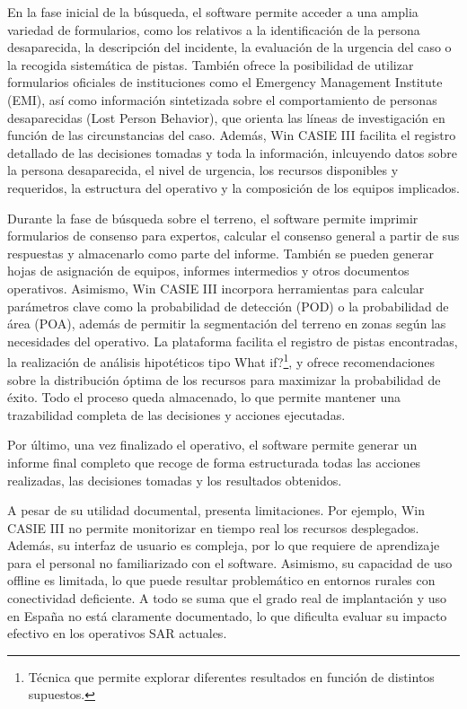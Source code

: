     En la fase inicial de la búsqueda, el software permite acceder a una amplia variedad de formularios, como los relativos a la identificación de la persona desaparecida, la descripción del incidente, la evaluación de la urgencia del caso o la recogida sistemática de pistas. También ofrece la posibilidad de utilizar formularios oficiales de instituciones como el Emergency Management Institute (EMI), así como información sintetizada sobre el comportamiento de personas desaparecidas (Lost Person Behavior), que orienta las líneas de investigación en función de las circunstancias del caso. Además, Win CASIE III facilita el registro detallado de las decisiones tomadas y toda la información, inlcuyendo datos sobre la persona desaparecida, el nivel de urgencia, los recursos disponibles y requeridos, la estructura del operativo y la composición de los equipos implicados.

    Durante la fase de búsqueda sobre el terreno, el software permite imprimir formularios de consenso para expertos, calcular el consenso general a partir de sus respuestas y almacenarlo como parte del informe. También se pueden generar hojas de asignación de equipos, informes intermedios y otros documentos operativos. Asimismo, Win CASIE III incorpora herramientas para calcular parámetros clave como la probabilidad de detección (POD) o la probabilidad de área (POA), además de permitir la segmentación del terreno en zonas según las necesidades del operativo. La plataforma facilita el registro de pistas encontradas, la realización de análisis hipotéticos tipo What if?\footnote{Técnica que permite explorar diferentes resultados en función de distintos supuestos.}, y ofrece recomendaciones sobre la distribución óptima de los recursos para maximizar la probabilidad de éxito. Todo el proceso queda almacenado, lo que permite mantener una trazabilidad completa de las decisiones y acciones ejecutadas.

    Por último, una vez finalizado el operativo, el software permite generar un informe final completo que recoge de forma estructurada todas las acciones realizadas, las decisiones tomadas y los resultados obtenidos.
    
    A pesar de su utilidad documental, presenta limitaciones. Por ejemplo, Win CASIE III no permite monitorizar en tiempo real los recursos desplegados. Además, su interfaz de usuario es compleja, por lo que requiere de aprendizaje para el personal no familiarizado con el software. Asimismo, su capacidad de uso offline es limitada, lo que puede resultar problemático en entornos rurales con conectividad deficiente. A todo se suma que el grado real de implantación y uso en España no está claramente documentado, lo que dificulta evaluar su impacto efectivo en los operativos SAR actuales.
    
